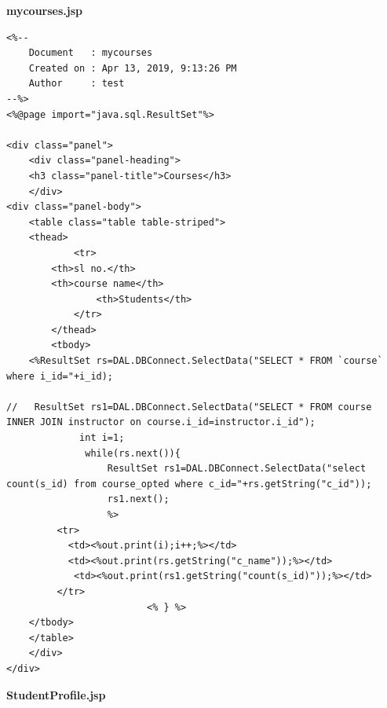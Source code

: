 {\bf mycourses.jsp}
\begin{lstlisting}
<%-- 
    Document   : mycourses
    Created on : Apr 13, 2019, 9:13:26 PM
    Author     : test
--%>
<%@page import="java.sql.ResultSet"%>

<div class="panel">
    <div class="panel-heading">
	<h3 class="panel-title">Courses</h3>
    </div>
<div class="panel-body">
    <table class="table table-striped">
	<thead>
            <tr>
		<th>sl no.</th>
		<th>course name</th>
                <th>Students</th>
            </tr>
        </thead>
        <tbody>
	<%ResultSet rs=DAL.DBConnect.SelectData("SELECT * FROM `course` where i_id="+i_id);
                                                                                 //   ResultSet rs1=DAL.DBConnect.SelectData("SELECT * FROM course INNER JOIN instructor on course.i_id=instructor.i_id");
             int i=1;
              while(rs.next()){
                  ResultSet rs1=DAL.DBConnect.SelectData("select count(s_id) from course_opted where c_id="+rs.getString("c_id"));
                  rs1.next();
                  %>
         <tr>
           <td><%out.print(i);i++;%></td>
           <td><%out.print(rs.getString("c_name"));%></td>
            <td><%out.print(rs1.getString("count(s_id)"));%></td>
         </tr>
                         <% } %>
	</tbody>
	</table>
	</div>
</div>
\end{lstlisting}
{\bf StudentProfile.jsp}
